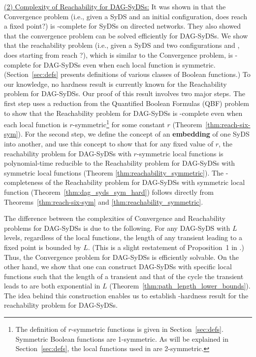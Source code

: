 \noindent
\underline{(2) Complexity of Reachability for DAG-SyDSs:}
It was shown in
\cite{Chistikov-etal-2020} that the Convergence problem
(i.e., given a SyDS \cals{} and an initial configuration,
does \cals{} reach a fixed point?) is \cpsp-complete
for SyDSs on directed networks.
They also showed that the convergence problem can be solved efficiently
for DAG-SyDSs.
We show that the reachability problem
(i.e., given a SyDS \cals{} and two configurations \calc{} and \cald{},
does \cals{} starting from \calc{} reach \cald{}?),
which is similar to the Convergence problem, 
is \cpsp-complete for DAG-SyDSs even
when each local function is symmetric.
(Section~\ref{sec:defs} presents definitions of various classes
of Boolean functions.)
To our knowledge, no hardness result is currently known for
the Reachability problem for DAG-SyDSs.
Our proof of this result involves two major steps.
The first step uses a reduction from the Quantified Boolean Formulas
(QBF) problem \cite{GJ-1979} to show that the Reachability problem for DAG-SyDSs is
\cpsp-complete even when each local function is 
$r$-symmetric\footnote{The definition of $r$-symmetric functions is given in
Section~\ref{sec:defs}. Symmetric Boolean functions
are 1-symmetric. As will be explained in Section~\ref{sec:defs},
the local functions used in \cite{Chistikov-etal-2020} are
2-symmetric.}
for some constant $r$ (Theorem~\ref{thm:reach-six-sym}).
For the second step,
we define the concept of an \textbf{embedding} of one SyDS into another,
and use this concept to show that
for any fixed value of $r$, 
the reachability problem for DAG-SyDSs with $r$-symmetric local functions 
is polynomial-time reducible to the Reachability problem for DAG-SyDSs with
symmetric  local functions (Theorem \ref{thm:reachability_symmetric}).
The \cpsp-completeness of the Reachability problem for DAG-SyDSs with 
symmetric local function (Theorem~\ref{thm:dag_syds_sym_hard})
follows directly from Theorems~\ref{thm:reach-six-sym} and 
\ref{thm:reachability_symmetric}.

\smallskip
The difference between the complexities of Convergence
and Reachability problems for DAG-SyDSs is due to the following.
For any DAG-SyDS with $L$ levels, regardless of the local functions,
the length of any transient leading to a fixed point is bounded
by $L$. (This is a slight restatement of Proposition~1 
in \cite{Chistikov-etal-2020}.)
Thus, the Convergence problem for DAG-SyDSs is efficiently solvable.
On the other hand, we show that one can construct DAG-SyDSs with specific local
functions such that the length of a transient and that of 
the cycle the transient leads to are both exponential in $L$
(Theorem~\ref{thm:path_length_lower_bounds}).
The idea behind this construction enables us 
to establish \cpsp-hardness result for
the reachability problem for DAG-SyDSs.

